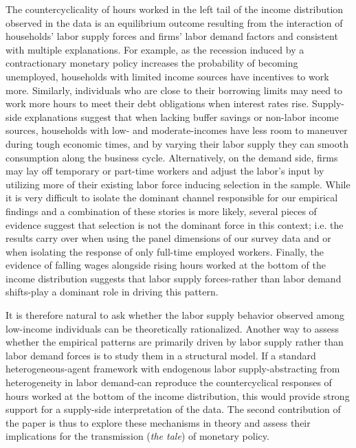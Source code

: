 \documentclass[a4paper,12pt]{article}%
\begin{document}
The countercyclicality of hours worked in the left tail of the income distribution observed in the data is an equilibrium outcome resulting from
the interaction of households' labor supply forces and firms' labor demand
factors and consistent with multiple explanations. For example, as the recession induced by a contractionary monetary policy increases the probability of becoming unemployed, households with limited income sources have incentives to work more.
Similarly, individuals who are close to their borrowing limits may need to work more hours to meet their debt obligations when interest rates rise. Supply-side explanations suggest that when lacking buffer savings or non-labor income sources, households with low- and moderate-incomes have less room to maneuver during tough economic times, and by varying their labor supply they can smooth consumption along the business cycle. Alternatively, on the demand side, firms may lay off temporary or part-time workers and adjust the labor's input by utilizing more of their existing labor force inducing selection in the sample.
While it is very difficult to isolate the dominant channel responsible for our empirical findings and a combination of these stories is more likely, several pieces of evidence suggest that selection is not the dominant force in this context; i.e. the results carry over when using the panel dimensions of our survey data and or when isolating the response of only full-time employed workers.
Finally, the evidence of falling wages alongside rising hours worked at the bottom of the income distribution suggests that labor supply forces-rather than labor demand shifts-play a dominant role in driving this pattern. 

It is therefore natural to ask whether the labor supply behavior observed among low-income individuals can be theoretically rationalized. Another way to assess whether the empirical patterns are primarily driven by labor supply rather than labor demand forces is to study them in a structural model. If a standard heterogeneous-agent framework with endogenous labor supply-abstracting from heterogeneity in labor demand-can reproduce the countercyclical responses of hours worked at the bottom of the income distribution, this would provide strong support for a supply-side interpretation of the data. The second contribution of the paper is thus to explore these mechanisms in theory and assess their implications for the transmission (\emph{the tale}) of monetary policy.
\end{document}
